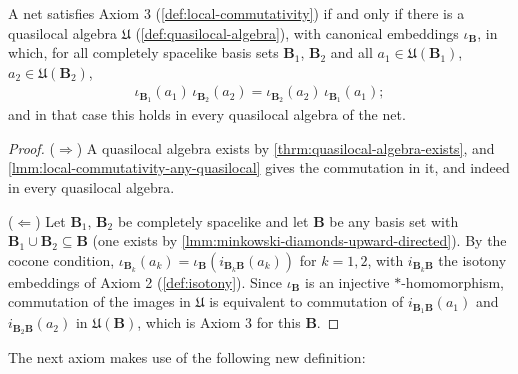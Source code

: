 \begin{lemma}
    \label{lmm:local-commutativity-iff-quasilocal}
    \leanok
    A net satisfies Axiom 3 (\ref{def:local-commutativity}) if and only if there is a quasilocal algebra $\mathfrak{U}$ (\ref{def:quasilocal-algebra}), with canonical embeddings $\iota_{\mathbf{B}}$, in which, for all completely spacelike basis sets $\mathbf{B}_1$, $\mathbf{B}_2$ and all $a_1 \in \mathfrak{U}(\mathbf{B}_1)$, $a_2 \in \mathfrak{U}(\mathbf{B}_2)$,
    \begin{align}
        \iota_{\mathbf{B}_1}(a_1)\, \iota_{\mathbf{B}_2}(a_2) = \iota_{\mathbf{B}_2}(a_2)\, \iota_{\mathbf{B}_1}(a_1);
    \end{align}
    and in that case this holds in every quasilocal algebra of the net.
\end{lemma}
\begin{proof}
    \leanok
    ($\Rightarrow$) A quasilocal algebra exists by \ref{thrm:quasilocal-algebra-exists}, and \ref{lmm:local-commutativity-any-quasilocal} gives the commutation in it, and indeed in every quasilocal algebra.

    ($\Leftarrow$) Let $\mathbf{B}_1$, $\mathbf{B}_2$ be completely spacelike and let $\mathbf{B}$ be any basis set with $\mathbf{B}_1 \cup \mathbf{B}_2 \subseteq \mathbf{B}$ (one exists by \ref{lmm:minkowski-diamonds-upward-directed}). By the cocone condition, $\iota_{\mathbf{B}_k}(a_k) = \iota_{\mathbf{B}}(i_{\mathbf{B}_k\mathbf{B}}(a_k))$ for $k = 1, 2$, with $i_{\mathbf{B}_k\mathbf{B}}$ the isotony embeddings of Axiom 2 (\ref{def:isotony}). Since $\iota_{\mathbf{B}}$ is an injective $*$-homomorphism, commutation of the images in $\mathfrak{U}$ is equivalent to commutation of $i_{\mathbf{B}_1\mathbf{B}}(a_1)$ and $i_{\mathbf{B}_2\mathbf{B}}(a_2)$ in $\mathfrak{U}(\mathbf{B})$, which is Axiom 3 for this $\mathbf{B}$.
\end{proof}

The next axiom makes use of the following new definition:

